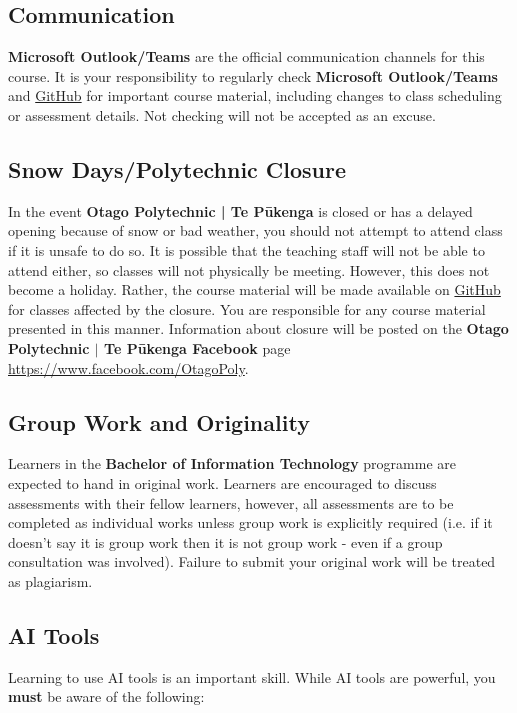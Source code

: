 \documentclass{article}
\begin{document}
\subsection*{Communication}
\textbf{Microsoft Outlook/Teams} are the official communication channels for this course. It is your responsibility to regularly check \textbf{Microsoft Outlook/Teams} and \href{https://github.com/otago-polytechnic-bit-courses/ID608001-intermediate-app-dev-concepts}{GitHub} for important course material, including changes to class scheduling or assessment details. Not checking will not be accepted as an excuse.

\subsection*{Snow Days/Polytechnic Closure}
In the event \textbf{Otago Polytechnic | Te Pūkenga} is closed or has a delayed opening because of snow or bad weather, you should not attempt to attend class if it is unsafe to do so. It is possible that the teaching staff will not be able to attend either, so classes will not physically be meeting. However, this does not become a holiday. Rather, the course material will be made available on \href{https://github.com/otago-polytechnic-bit-courses/ID608001-intermediate-app-dev-concepts}{GitHub} for classes affected by the closure. You are responsible for any course material presented in this manner. Information about closure will be posted on the \textbf{Otago Polytechnic $|$ Te Pūkenga Facebook} page \href{https://www.facebook.com/OtagoPoly}{https://www.facebook.com/OtagoPoly}.

\subsection*{Group Work and Originality}
Learners in the \textbf{Bachelor of Information Technology} programme are expected to hand in original work. Learners are encouraged to discuss assessments with their fellow learners, however, all assessments are to be completed as individual works unless group work is explicitly required (i.e. if it doesn't say it is group work then it is not group work - even if a group consultation was involved). Failure to submit your original work will be treated as plagiarism.

\subsection*{AI Tools}
Learning to use AI tools is an important skill. While AI tools are powerful, you \textbf{must} be aware of the following:
\end{document}
